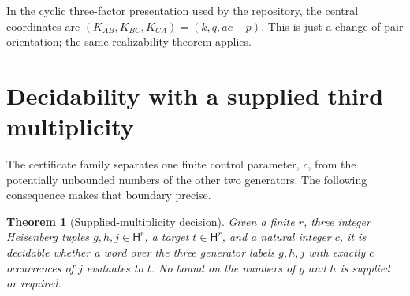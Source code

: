 \documentclass[11pt,letterpaper]{article}
\newtheorem{theorem}{Theorem}[section]
\theoremstyle{definition}
\theoremstyle{remark}
\newcommand{\HH}{\mathsf H}
\begin{document}
In the cyclic three-factor presentation used by the repository, the central coordinates are $(K_{AB},K_{BC},K_{CA})=(k,q,ac-p)$. This is just a change of pair orientation; the same realizability theorem applies.

\section{Decidability with a supplied third multiplicity}
The certificate family separates one finite control parameter, $c$, from the potentially unbounded numbers of the other two generators. The following consequence makes that boundary precise.

\begin{theorem}[Supplied-multiplicity decision]\label{gts:po:thm:decidable}
Given a finite $r$, three integer Heisenberg tuples $g,h,j\in\HH^r$, a target $t\in\HH^r$, and a natural integer $c$, it is decidable whether a word over the three generator labels $g,h,j$ with exactly $c$ occurrences of $j$ evaluates to $t$. No bound on the numbers of $g$ and $h$ is supplied or required.
\end{theorem}
\end{document}
